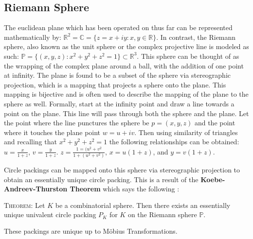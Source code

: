 \documentclass[11pt]{article}
\newcommand{\R}{\mathbb{R}}
\newcommand{\C}{\mathbb{C}}
\begin{document}
\subsection{Riemann Sphere}
The euclidean plane which has been operated on thus far can be represented mathematically by: $\R^2 = \C = \{z = x + iy : x, y \in \R \}$. In contrast, the Riemann sphere, also known as the unit sphere or the complex projective line is modeled as such: $\mathbb{P} = \{(x,y,z):x^2 + y^2 + z^2 = 1\} \subset \R^3$. This sphere can be thought of as the wrapping of the complex plane around a ball, with the addition of one point at infinity. The plane is found to be a subset of the sphere via stereographic projection, which is a mapping that projects a sphere onto the plane. This mapping is bijective and is often used to describe the mapping of the plane to the sphere as well. Formally, start at the infinity point and draw a line towards a point on the plane. This line will pass through both the sphere and the plane. Let the point where the line punctures the sphere be $p = (x,y,z)$ and the point where it touches the plane point $w = u + iv$. Then using similarity of triangles and recalling that $x^2 + y^2 + z^2 = 1$ the following relationships can be obtained: $u = \frac{x}{1 + z}$, $v = \frac{y}{1+ z}$. $z = \frac{1 = (u^2 + v^2}{1 + (u^2 + v^2)}$, $x = u(1+z)$, and $y =v(1+z)$.

Circle packings can be mapped onto this sphere via stereographic projection to obtain an essentially unique circle packing. This is a result of the \textbf{Koebe-Andreev-Thurston Theorem} which says the following \cite{stephenson05introduction}:

\textsc{Theorem}: Let $K$ be a combinatorial sphere. Then there exists an essentially unique univalent circle packing $P_K$ for $K$ on the Riemann sphere $\mathbb{P}$.

These packings are unique up to M\"{o}bius Transformations.
\end{document}
